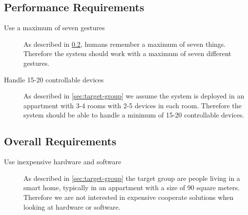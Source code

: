 
\subsection{Performance Requirements}

\begin{description}
\item[Use a maximum of seven gestures] As described in \cref{}, humans remember a maximum of seven things. Therefore the system should work with a maximum of seven different gestures. 
\item[Handle 15-20 controllable devices] As described in \cref{sec:target-group} we assume the system is deployed in an appartment with 3-4 rooms with 2-5 devices in each room. Therefore the system should be able to handle a minimum of 15-20 controllable devices.
\end{description}

\subsection{Overall Requirements}

\begin{description}
\item[Use inexpensive hardware and software] As described in \cref{sec:target-group} the target group are people living in a smart home, typically in an appartment with a size of 90 square meters. Therefore we are not interested in expensive cooperate solutions when looking at hardware or software.
\end{description}

